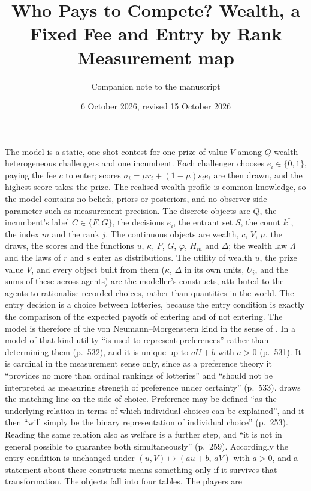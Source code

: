 \documentclass[11pt]{article}
\title{Who Pays to Compete? Wealth, a Fixed Fee and Entry by Rank\\[2pt]
  \large Measurement map}
\author{Companion note to the manuscript}
\date{6 October 2026, revised 15 October 2026}
\begin{document}
\maketitle

\noindent The model is a static, one-shot contest for one prize of value $V$
among $Q$ wealth-heterogeneous challengers and one incumbent. Each challenger
chooses $e_i\in\{0,1\}$, paying the fee $c$ to enter; scores
$\sigma_i=\mu r_i+(1-\mu)s_ie_i$ are then drawn, and the highest score takes the
prize. The realised wealth profile is common knowledge, so the model contains
no beliefs, priors or posteriors, and no observer-side parameter such as
measurement precision. The discrete objects are $Q$, the incumbent's label
$C\in\{F,G\}$, the decisions $e_i$, the entrant set $S$, the count $k^*$, the
index $m$ and the rank $j$. The continuous objects are wealth, $c$, $V$, $\mu$,
the draws, the scores and the functions $u$, $\kappa$, $F$, $G$, $\varphi$,
$H_m$ and $\Delta$; the wealth law $\Lambda$ and the laws of $r$ and $s$ enter
as distributions. The utility of wealth $u$, the prize value $V$, and every
object built from them ($\kappa$, $\Delta$ in its own units, $U_i$, and the
sums of these across agents) are the modeller's constructs, attributed to the
agents to rationalise recorded choices, rather than quantities in the world.
The entry decision is a choice between lotteries, because the entry condition
is exactly the comparison of the expected payoffs of entering and of not
entering. The model is therefore of the von Neumann--Morgenstern kind in the
sense of \citet{Schoemaker1982}. In a model of that kind utility ``is used to
represent preferences'' rather than determining them (p.~532), and it is
unique up to $aU+b$ with $a>0$ (p.~531). It is cardinal in the measurement
sense only, since as a preference theory it ``provides no more than ordinal
rankings of lotteries'' and ``should not be interpreted as measuring strength
of preference under certainty'' (p.~533). \citet{Sen1973} draws the matching
line on the side of choice. Preference may be defined ``as the underlying
relation in terms of which individual choices can be explained'', and it then
``will simply be the binary representation of individual choice'' (p.~253).
Reading the same relation also as welfare is a further step, and ``it is not
in general possible to guarantee both simultaneously'' (p.~259). Accordingly
the entry condition is unchanged under $(u,V)\mapsto(au+b,\,aV)$ with $a>0$,
and a statement about these constructs means something only if it survives
that transformation. The objects fall into four tables. The players are
\end{document}
